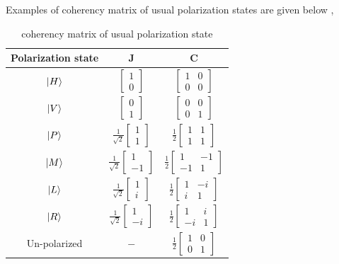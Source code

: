 \documentclass[11pt,a4paper]{article}
\numberwithin{equation}{section}
\begin{document}
Examples of coherency matrix of usual polarization states are given below \cite{coherency},
\begin{table}[H]
	\centering
	\begin{tabular}{ c c c } 
		\hline
		\hline
		Polarization state & \textbf{J} & \textbf{C}\\
		\hline
		$\ket{H}$ & $\begin{bmatrix}1\\0\end{bmatrix}$ & $\begin{bmatrix}1&0\\0&0\end{bmatrix}$\\ \hline
		$\ket{V}$ & $\begin{bmatrix}0\\1\end{bmatrix}$ & $\begin{bmatrix}0&0\\0&1\end{bmatrix}$\\ \hline
		$\ket{P}$ & $\frac{1}{\sqrt{2}}\begin{bmatrix}1\\1\end{bmatrix}$ & $\frac{1}{2}\begin{bmatrix}1&1\\1&1\end{bmatrix}$\\ \hline
		$\ket{M}$ & $\frac{1}{\sqrt{2}}\begin{bmatrix}1\\-1\end{bmatrix}$ & $\frac{1}{2}\begin{bmatrix}1&-1\\-1&1\end{bmatrix}$\\ \hline
		$\ket{L}$ & $\frac{1}{\sqrt{2}}\begin{bmatrix}1\\i\end{bmatrix}$ & $\frac{1}{2}\begin{bmatrix}1&-i\\i&1\end{bmatrix}$\\ \hline
		$\ket{R}$ & $\frac{1}{\sqrt{2}}\begin{bmatrix}1\\-i\end{bmatrix}$ & $\frac{1}{2}\begin{bmatrix}1&i\\-i&1\end{bmatrix}$\\ \hline
		Un-polarized & $-$ &  $\frac{1}{2}\begin{bmatrix}1&0\\0&1\end{bmatrix}$\\
		\hline
		\hline
	\end{tabular}
	\caption{coherency matrix of usual polarization state}
	\label{table:3}
\end{table}
\end{document}
